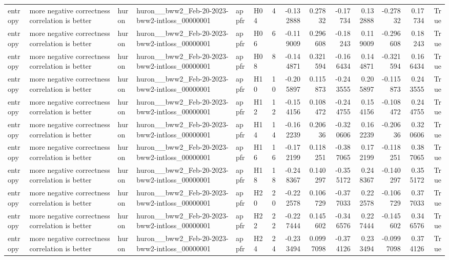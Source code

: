 \begin{longtable}{llllllrrrrrrrr}
entropy & more negative correctness correlation is better & huron & huron\_\_bww2\_Feb-20-2023-bww2-intloss\_00000001 & appfr & H04 & 4 & -0.132888 & 0.27832 & -0.17734 & 0.132888 & -0.27832 & 0.17734 & True \\
entropy & more negative correctness correlation is better & huron & huron\_\_bww2\_Feb-20-2023-bww2-intloss\_00000001 & appfr & H06 & 6 & -0.119009 & 0.296608 & -0.18243 & 0.119009 & -0.296608 & 0.18243 & True \\
entropy & more negative correctness correlation is better & huron & huron\_\_bww2\_Feb-20-2023-bww2-intloss\_00000001 & appfr & H08 & 8 & -0.144871 & 0.321594 & -0.166434 & 0.144871 & -0.321594 & 0.166434 & True \\
entropy & more negative correctness correlation is better & huron & huron\_\_bww2\_Feb-20-2023-bww2-intloss\_00000001 & appfr & H10 & 10 & -0.205897 & 0.115873 & -0.243555 & 0.205897 & -0.115873 & 0.243555 & True \\
entropy & more negative correctness correlation is better & huron & huron\_\_bww2\_Feb-20-2023-bww2-intloss\_00000001 & appfr & H12 & 12 & -0.154156 & 0.108472 & -0.244755 & 0.154156 & -0.108472 & 0.244755 & True \\
entropy & more negative correctness correlation is better & huron & huron\_\_bww2\_Feb-20-2023-bww2-intloss\_00000001 & appfr & H14 & 14 & -0.162239 & 0.20636 & -0.320606 & 0.162239 & -0.20636 & 0.320606 & True \\
entropy & more negative correctness correlation is better & huron & huron\_\_bww2\_Feb-20-2023-bww2-intloss\_00000001 & appfr & H16 & 16 & -0.172199 & 0.118251 & -0.387065 & 0.172199 & -0.118251 & 0.387065 & True \\
entropy & more negative correctness correlation is better & huron & huron\_\_bww2\_Feb-20-2023-bww2-intloss\_00000001 & appfr & H18 & 18 & -0.248367 & 0.140297 & -0.355172 & 0.248367 & -0.140297 & 0.355172 & True \\
entropy & more negative correctness correlation is better & huron & huron\_\_bww2\_Feb-20-2023-bww2-intloss\_00000001 & appfr & H20 & 20 & -0.222578 & 0.106729 & -0.377033 & 0.222578 & -0.106729 & 0.377033 & True \\
entropy & more negative correctness correlation is better & huron & huron\_\_bww2\_Feb-20-2023-bww2-intloss\_00000001 & appfr & H22 & 22 & -0.227444 & 0.145602 & -0.346576 & 0.227444 & -0.145602 & 0.346576 & True \\
entropy & more negative correctness correlation is better & huron & huron\_\_bww2\_Feb-20-2023-bww2-intloss\_00000001 & appfr & H24 & 24 & -0.233494 & 0.0997098 & -0.374126 & 0.233494 & -0.0997098 & 0.374126 & True \\

\end{longtable}
